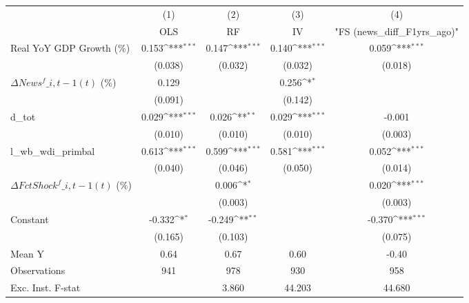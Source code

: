 {
\def\sym#1{\ifmmode^{#1}\else\(^{#1}\)\fi}
\begin{tabular}{l*{4}{c}}
\toprule
                    &\multicolumn{1}{c}{(1)}&\multicolumn{1}{c}{(2)}&\multicolumn{1}{c}{(3)}&\multicolumn{1}{c}{(4)}\\
                    &\multicolumn{1}{c}{OLS}&\multicolumn{1}{c}{RF}&\multicolumn{1}{c}{IV}&\multicolumn{1}{c}{ "FS (news\_diff\_F1yrs\_ago)" }\\
\midrule
Real YoY GDP Growth (\%)&       0.153\sym{***}&       0.147\sym{***}&       0.140\sym{***}&       0.059\sym{***}\\
                    &     (0.038)         &     (0.032)         &     (0.032)         &     (0.018)         \\
\addlinespace
$ \Delta News^f\_{i,t-1}(t)$ (\%)&       0.129         &                     &       0.256\sym{*}  &                     \\
                    &     (0.091)         &                     &     (0.142)         &                     \\
\addlinespace
d\_tot               &       0.029\sym{***}&       0.026\sym{**} &       0.029\sym{***}&      -0.001         \\
                    &     (0.010)         &     (0.010)         &     (0.010)         &     (0.003)         \\
\addlinespace
l\_wb\_wdi\_primbal    &       0.613\sym{***}&       0.599\sym{***}&       0.581\sym{***}&       0.052\sym{***}\\
                    &     (0.040)         &     (0.046)         &     (0.050)         &     (0.014)         \\
\addlinespace
$ \Delta FctShock^f\_{i,t-1}(t)$ (\%)&                     &       0.006\sym{*}  &                     &       0.020\sym{***}\\
                    &                     &     (0.003)         &                     &     (0.003)         \\
\addlinespace
Constant            &      -0.332\sym{*}  &      -0.249\sym{**} &                     &      -0.370\sym{***}\\
                    &     (0.165)         &     (0.103)         &                     &     (0.075)         \\
\midrule
Mean Y              &        0.64         &        0.67         &        0.60         &       -0.40         \\
Observations        &         941         &         978         &         930         &         958         \\
Exc. Inst. F-stat   &                     &       3.860         &      44.203         &      44.680         \\
\bottomrule
\end{tabular}
}
